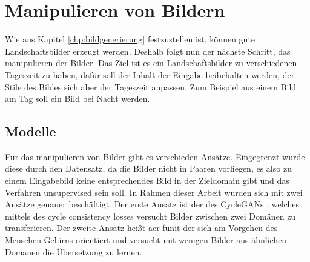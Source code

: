 \chapter{Manipulieren von Bildern}\label{chp:bildmanipulation} %
\glsresetall

 Wie aus Kapitel \ref{chp:bildgenerierung} festzustellen ist, können gute Landschaftsbilder erzeugt werden. Deshalb folgt nun der nächste Schritt, das manipulieren der Bilder. Das Ziel ist es ein Landschaftsbilder zu verschiedenen Tageszeit zu haben, dafür soll der Inhalt der Eingabe beibehalten werden,  der Stile des Bildes sich aber der Tageszeit anpassen. Zum Beispiel aus einem Bild am Tag soll ein Bild bei Nacht werden.
 
 \section{Modelle} %
 Für das manipulieren von Bilder gibt es verschieden Ansätze. Eingegrenzt wurde diese durch den Datensatz, da die Bilder nicht in Paaren vorliegen, es also zu einem Eingabebild keine entsprechendes Bild in der Zieldomain gibt und das Verfahren unsupervised sein soll. %
 In Rahmen dieser Arbeit wurden sich mit  zwei Ansätze genauer beschäftigt. Der erste Ansatz ist der des CycleGANs \cite{zhu2017unpaired}, welches mittels des cycle consistency losses versucht Bilder zwischen zwei Domänen zu transferieren. Der zweite Ansatz heißt  \gls{acr-funit} \cite{liu2019few} der sich am Vorgehen des Menschen Gehirns orientiert und versucht mit wenigen Bilder aus ähnlichen Domänen die Übersetzung zu lernen.
 
